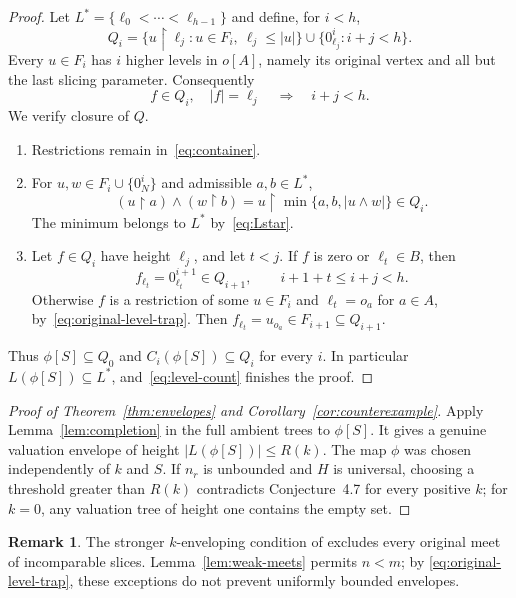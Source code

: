 \documentclass{article}
\numberwithin{equation}{section}
\theoremstyle{definition}
\newtheorem{remark}[theorem]{Remark}
\newcommand{\res}{\mathbin{\upharpoonright}}
\begin{document}
\begin{proof}
Let $L^*=\{\ell_0<\cdots<\ell_{h-1}\}$ and define, for $i<h$,
\begin{equation}\label{eq:container}
Q_i=\{u\res\ell_j:u\in F_i,\ \ell_j\leq|u|\}
     \cup\{0_{\ell_j}^i:i+j<h\}.
\end{equation}
Every $u\in F_i$ has $i$ higher levels in $o[A]$, namely its original
vertex and all but the last slicing parameter. Consequently
\begin{equation}\label{eq:container-triangle}
 f\in Q_i,\quad |f|=\ell_j\quad\Longrightarrow\quad i+j<h.
\end{equation}
We verify closure of $Q$.
\begin{enumerate}
\item Restrictions remain in~\eqref{eq:container}.
\item For $u,w\in F_i\cup\{0_N^i\}$ and admissible $a,b\in L^*$,
\[
 (u\res a)\wedge(w\res b)
   =u\res\min\{a,b,|u\wedge w|\}\in Q_i.
\]
The minimum belongs to $L^*$ by~\eqref{eq:Lstar}.
\item Let $f\in Q_i$ have height $\ell_j$, and let $t<j$.
If $f$ is zero or $\ell_t\in B$, then
\[
 f_{\ell_t}=0^{{i+1}}_{\ell_t}\in Q_{i+1},
 \qquad i+1+t\leq i+j<h.
\]
Otherwise $f$ is a restriction of some $u\in F_i$ and
$\ell_t=o_a$ for $a\in A$, by~\eqref{eq:original-level-trap}. Then
$f_{\ell_t}=u_{o_a}\in F_{i+1}\subseteq Q_{i+1}$.
\end{enumerate}
Thus $\phi[S]\subseteq Q_0$ and $C_i(\phi[S])\subseteq Q_i$ for every $i$.
In particular $L(\phi[S])\subseteq L^*$, and~\eqref{eq:level-count} finishes
the proof.
\end{proof}

\begin{proof}[Proof of Theorem~\ref{thm:envelopes} and Corollary~\ref{cor:counterexample}]
Apply Lemma~\ref{lem:completion} in the full ambient trees to $\phi[S]$.
It gives a genuine valuation envelope of height $|L(\phi[S])|\leq R(k)$.
The map $\phi$ was chosen independently of $k$ and $S$.
If $n_r$ is unbounded and $H$ is universal, choosing a threshold greater than
$R(k)$ contradicts Conjecture~4.7 for every positive $k$; for $k=0$, any
valuation tree of height one contains the empty set.
\end{proof}

\begin{remark}
The stronger $k$-enveloping condition of
\cite[Definition~4.2]{InfiniteLanguages} excludes every original meet of
incomparable slices. Lemma~\ref{lem:weak-meets} permits $n<m$; by
\eqref{eq:original-level-trap}, these exceptions do not prevent uniformly
bounded envelopes.
\end{remark}
\end{document}

